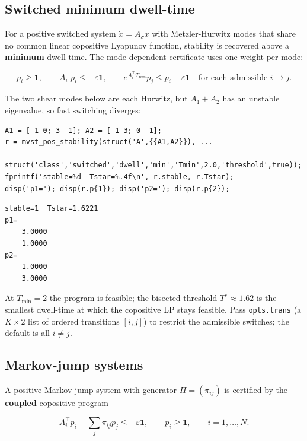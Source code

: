 \documentclass[11pt,oneside]{report}
\newcommand{\code}[1]{\texttt{#1}}
\begin{document}
\hypertarget{switched-minimum-dwell-time}{%
\subsection{Switched minimum dwell-time}\label{switched-minimum-dwell-time}}

For a positive switched system \(\dot x = A_{\sigma} x\) with Metzler-Hurwitz modes
that share no common linear copositive Lyapunov function, stability is recovered
above a \textbf{minimum} dwell-time. The mode-dependent certificate uses one weight
per mode:

\[
p_i \ge \mathbf{1},
\qquad
A_i^\top p_i \le -\varepsilon \mathbf{1},
\qquad
e^{A_i^\top T_{\min}} p_j \le p_i - \varepsilon \mathbf{1}
\quad\text{for each admissible } i \to j .
\]

The two shear modes below are each Hurwitz, but \(A_1 + A_2\) has an unstable
eigenvalue, so fast switching diverges:

\begin{lstlisting}[style=matlabstyle]
A1 = [-1 0; 3 -1]; A2 = [-1 3; 0 -1];
r = mvst_pos_stability(struct('A',{{A1,A2}}), ...
        struct('class','switched','dwell','min','Tmin',2.0,'threshold',true));
fprintf('stable=%d  Tstar=%.4f\n', r.stable, r.Tstar);
disp('p1='); disp(r.p{1}); disp('p2='); disp(r.p{2});
\end{lstlisting}

\begin{lstlisting}[style=outputstyle]
stable=1  Tstar=1.6221
p1=
    3.0000
    1.0000
p2=
    1.0000
    3.0000
\end{lstlisting}

At \(T_{\min} = 2\) the program is feasible; the bisected threshold
\(\bar T^\star \approx 1.62\) is the smallest dwell-time at which the copositive LP
stays feasible. Pass \code{opts.trans} (a \(K \times 2\) list of ordered transitions
\([i, j]\)) to restrict the admissible switches; the default is all \(i \ne j\).

\hypertarget{markov-jump-systems}{%
\subsection{Markov-jump systems}\label{markov-jump-systems}}

A positive Markov-jump system with generator \(\Pi = (\pi_{ij})\) is certified by
the \textbf{coupled} copositive program

\[
A_i^\top p_i + \sum_{j} \pi_{ij}  p_j \le -\varepsilon \mathbf{1},
\qquad p_i \ge \mathbf{1},
\qquad i = 1,\dots,N .
\]
\end{document}
